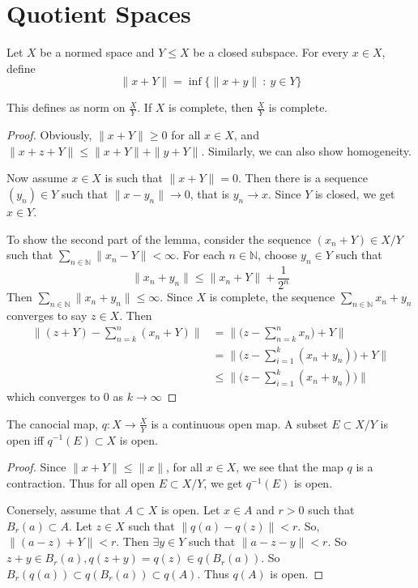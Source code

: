 \section{Quotient Spaces}
\begin{definition}
  Let $X$ be a normed space and $Y \leqslant X$ be a closed subspace. For every $x \in X$, define \[
       \|x + Y\| = \inf \{ \|x+y\| \ : \ y \in Y \}
  \]
\end{definition}
\begin{lemma}
  This defines as norm on  $\frac{X}{Y}$. If $X$ is complete, then $ \frac{X}{Y}$ is complete.
\end{lemma}
\begin{proof}
  Obviously, $\|x+Y\| \ge 0 $ for all $ x \in X$, and $\|x+z + Y\| \le \|x+Y\| + \|y + Y\|$. Similarly, we can also show homogeneity.

  Now assume $x \in X$ is such that $\|x+Y\| = 0$. Then there is a sequence $(y_n) \in Y$ such that $ \|x - y_n\| \to 0$, that is $y_n \to x$. Since $Y$ is closed, we get $x \in Y$.

  To show the second part of the lemma, consider the sequence $(x_n + Y) \in X/Y$ such that $\sum_{n \in \mathbb{N}} \|x_n - Y\| < \infty$. For each $ n \in \mathbb{N}$, choose $y_n \in Y$ such that \[
    \|x_n + y_n\| \le \|x_n + Y\| + \frac{1}{2^n}
  \]
  Then $\sum_{n \in \mathbb{N}} \|x_n + y_n\| \le \infty$. Since $X$ is complete, the sequence $ \sum_{n \in \mathbb{N}} x_n + y_n$ converges to say $z \in X$. Then \begin{align*}
    \|(z+Y) - \sum_{n = k}^{n} (x_n +Y)\| &= \|\Big( z - \sum_{n = k}^{n} x_n \Big) + Y\| \\ 
    & = \|\Big( z - \sum_{i = 1}^{k}(x_n + y_n) \Big) + Y\| \\ 
    & \le \|\Big( z - \sum_{i = 1}^{k}(x_n + y_n) \Big) \|
  \end{align*}
  which converges to 0 as $k \to \infty$
\end{proof}

\begin{lemma}
  The canocial map, $q: X \to \frac{X}{Y}$ is a continuous open map. A subset $E \subset X/Y$ is open iff $ q^{-1}(E) \subset X$ is open.
\end{lemma}
\begin{proof}
  Since $\|x + Y\| \le \|x\|$,  for all $x \in X$, we see that the map $q$ is a contraction. Thus  for all open $E \subset X/Y$, we get $ q^{-1}(E)$ is open.

  Conersely, assume that $  A \subset X$ is open. Let $ x \in A$ and $ r > 0$ such that $B_r(a) \subset A$. Let $  z \in X$ such that $\|q(a) - q(z)\| < r$. So, $\|(a-z) + Y\| < r$. Then $\exists y \in Y$ such that $ \|a-z-y\| < r$. So $z+y \in B_r(a), q( z+y) = q( z) \in q( B_r(a))$. So $B_r(q(a)) \subset q(  B_r(a)) \subset q(A)$. Thus $q(A)$ is open.
\end{proof}
